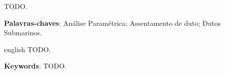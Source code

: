 
\setlength{\absparsep}{18pt} %
\begin{resumo}
TODO.

 \textbf{Palavras-chaves}: Análise Paramétrica; Assentamento de duto; Dutos Submarinos.
\end{resumo}

\begin{resumo}[Abstract]
 \begin{otherlanguage*}{english}
   TODO.

   \vspace{\onelineskip}
 
   \noindent 
   \textbf{Keywords}: TODO.
 \end{otherlanguage*}
\end{resumo}